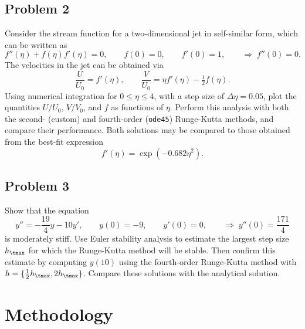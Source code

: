 \documentclass[12pt]{article}
\begin{document}
\subsection{Problem 2}

Consider the stream function for a two-dimensional jet in self-similar form, which can be written as
\begin{equation}
f''(\eta) + f(\eta) f'(\eta) = 0 ,\qquad
f(0) = 0 ,\qquad
f'(0) = 1 ,\qquad
\Rightarrow \;
f''(0) = 0
.
\end{equation}
The velocities in the jet can be obtained via
\begin{equation}
\frac{U}{U_0} = f'(\eta) ,\qquad
\frac{V}{U_0} = \eta f'(\eta) - \tfrac{1}{2} f(\eta)
.
\end{equation}
Using numerical integration for $0 \le \eta \le 4$, with a step size of $\Delta \eta = 0.05$, plot the quantities $U/U_0$, $V/V_0$, and $f$ as functions of $\eta$. Perform this analysis with both the second- (custom) and fourth-order (\lstinline|ode45|) Runge-Kutta methods, and compare their performance. Both solutions may be compared to those obtained from the best-fit expression
\begin{equation}
f'(\eta) = \exp(-0.682 \eta^2)
.
\end{equation}

\subsection{Problem 3}

Show that the equation
\begin{equation}
y'' = -\frac{19}{4} y - 10 y' ,\qquad
y(0) = -9 ,\qquad
y'(0) = 0 ,\qquad
\Rightarrow \;
y''(0) = \frac{171}{4}
\label{eq:prob3}
\end{equation}
is moderately stiff. Use Euler stability analysis to estimate the largest step size $h_\tmax$ for which the Runge-Kutta method will be stable. Then confirm this estimate by computing $y(10)$ using the fourth-order Runge-Kutta method with $h = \{ \tfrac{1}{2} h_\tmax, 2 h_\tmax\}$. Compare these solutions with the analytical solution.

\section{Methodology} %
\end{document}
